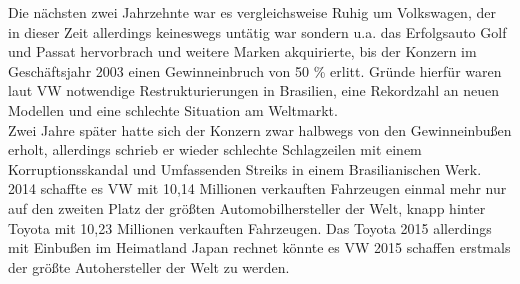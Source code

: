 \documentclass[12pt]{article}
\begin{document}
Die nächsten zwei Jahrzehnte war es vergleichsweise Ruhig um  Volkswagen, der in dieser Zeit allerdings keineswegs untätig war sondern u.a. das Erfolgsauto Golf und Passat hervorbrach und weitere Marken akquirierte, bis der Konzern im Geschäftsjahr 2003 einen Gewinneinbruch von 50 \% erlitt. Gründe hierfür waren laut VW notwendige Restrukturierungen in Brasilien, eine Rekordzahl an neuen Modellen und eine schlechte Situation am Weltmarkt. \cite{sud} \\
Zwei Jahre später hatte sich der Konzern zwar halbwegs von den Gewinneinbußen erholt, allerdings schrieb er wieder schlechte Schlagzeilen mit einem Korruptionsskandal und Umfassenden Streiks in einem Brasilianischen Werk. \cite{autowp}\\
2014 schaffte es VW mit 10,14 Millionen verkauften Fahrzeugen einmal mehr nur auf den zweiten Platz der größten Automobilhersteller der Welt, knapp hinter Toyota mit 10,23 Millionen verkauften Fahrzeugen. Das Toyota 2015 allerdings mit Einbußen im Heimatland Japan rechnet könnte es VW 2015 schaffen erstmals der größte Autohersteller der Welt zu werden.
\end{document}
